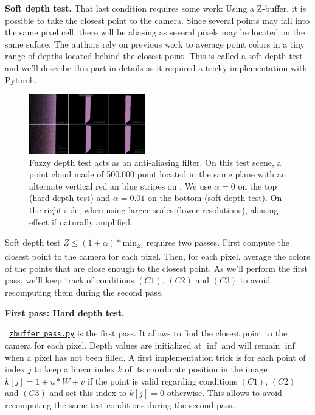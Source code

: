\noindent \textbf{Soft depth test.} 
That last condition requires some work:
Using a Z-buffer, it is possible to take the closest point to the camera. Since several points may fall into the same pixel cell, there will be aliasing as several pixels may be located on the same suface. The authors rely on previous work \cite{schutz2021rendering} to average point colors in a tiny range of depths located behind the closest point. This is called a soft depth test and we'll describe this part in details as it required a tricky implementation with Pytorch.

\begin{figure}[H]
    \centering
    \includegraphics[width=0.45\textwidth]{figures/fuzzy_depth_test_aliasing_large.png}
    \caption{Fuzzy depth test acts as an anti-aliasing filter. On this test scene, a point cloud made of 500.000 point located in the same plane with an alternate vertical red an blue stripes on . We use $\alpha=0$ on the top (hard depth test) and $\alpha=0.01$ on the bottom (soft depth test). On the right side, when using larger scales (lower resolutions), aliasing effect if naturally amplified.}
    \label{fig:fuzzy_depth_test_AA}
\end{figure}

Soft depth test $Z \leq (1 + \alpha) * \textrm{min}_{Z_{j}}$ requires two passes. First compute the closest point to the camera for each pixel. Then, for each pixel, average the colors of the points that are close enough to the closest point. As we'll perform the first pass, we'll keep track of conditions $(C1)$, $(C2)$ and $(C3)$ to avoid recomputing them during the second pass.

\noindent \textbf{First pass: Hard depth test.}

\noindent ~\href{https://github.com/balthazarneveu/per-pixel-point-rendering/blob/main/src/pixr/rendering/zbuffer\_pass.py#L5}{\texttt{zbuffer\_pass.py}} is the first pass. It allows to find the closest point to the camera for each pixel. Depth values are initialized at $\inf$ and will remain $\inf$ when a pixel has not been filled. A first implementation trick is for each point of index $j$ to keep a linear index $k$ of its coordinate position in the image $k[j] = 1+ u*W+v$ if the point is valid regarding conditions $(C1)$, $(C2)$ and $(C3)$ and set this index to $k[j]=0$ otherwise. This allows to avoid recomputing the same test conditions during the second pass.

